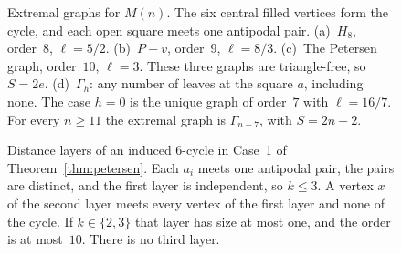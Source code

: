 \documentclass[ASNA]{USG}
\theoremstyle{WBstyletwo}
\numberwithin{equation}{section}
\newcommand{\lr}{\ell}
\begin{document}
\begin{figure}[htbp]
  \caption{Extremal graphs for $M(n)$. The six central filled vertices form the cycle, and each open square meets one antipodal pair.
    (a)~$H_8$, order~$8$, $\lr=5/2$.
    (b)~$P-v$, order~$9$, $\lr=8/3$.
    (c)~The Petersen graph, order~$10$, $\lr=3$. These three graphs are triangle-free, so $S=2e$.
    (d)~$\Gamma_h$: any number of leaves at the square $a$, including none. The case $h=0$ is the unique graph of order~$7$ with $\lr=16/7$. For every $n\ge 11$ the extremal graph is $\Gamma_{n-7}$, with $S=2n+2$.}
  \label{fig:petersen-extremal}
\end{figure}

\begin{figure}[htbp]
  \centering
  \caption{Distance layers of an induced $6$-cycle in Case~1 of Theorem~\ref{thm:petersen}.
    Each $a_i$ meets one antipodal pair, the pairs are distinct, and the first layer is independent, so $k\le 3$.
    A vertex $x$ of the second layer meets every vertex of the first layer and none of the cycle.
    If $k\in\{2,3\}$ that layer has size at most one, and the order is at most~$10$. There is no third layer.}
  \label{fig:layers}
\end{figure}
\end{document}

